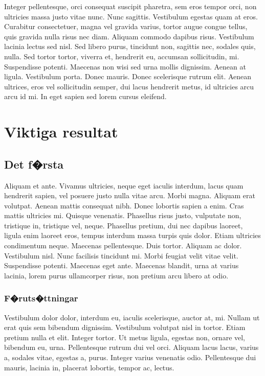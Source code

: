 \documentclass[a4paper,11pt]{kth-mag}
\begin{document}
Integer pellentesque, orci consequat suscipit pharetra, sem eros
tempor orci, non ultricies massa justo vitae nunc. Nunc sagittis.
Vestibulum egestas quam at eros. Curabitur consectetuer, magna vel
gravida varius, tortor augue congue tellus, quis gravida nulla risus
nec diam. Aliquam commodo dapibus risus. Vestibulum lacinia lectus sed
nisl. Sed libero purus, tincidunt non, sagittis nec, sodales quis,
nulla. Sed tortor tortor, viverra et, hendrerit eu, accumsan
sollicitudin, mi. Suspendisse potenti. Maecenas non wisi sed urna
mollis dignissim. Aenean at ligula. Vestibulum porta. Donec mauris.
Donec scelerisque rutrum elit. Aenean ultrices, eros vel sollicitudin
semper, dui lacus hendrerit metus, id ultricies arcu arcu id mi. In
eget sapien sed lorem cursus eleifend.

\part{Viktiga resultat}

\chapter{Det f�rsta}

Aliquam et ante. Vivamus ultricies, neque eget iaculis interdum, lacus
quam hendrerit sapien, vel posuere justo nulla vitae arcu. Morbi
magna. Aliquam erat volutpat. Aenean mattis consequat nibh. Donec
lobortis sapien a enim. Cras mattis ultricies mi. Quisque venenatis.
Phasellus risus justo, vulputate non, tristique in, tristique vel,
neque. Phasellus pretium, dui nec dapibus laoreet, ligula enim laoreet
eros, tempus interdum massa turpis quis dolor. Etiam ultricies
condimentum neque. Maecenas pellentesque. Duis tortor. Aliquam ac
dolor. Vestibulum nisl. Nunc facilisis tincidunt mi. Morbi feugiat
velit vitae velit. Suspendisse potenti. Maecenas eget ante. Maecenas
blandit, urna at varius lacinia, lorem purus ullamcorper risus, non
pretium arcu libero at odio.

\section{F�ruts�ttningar}

Vestibulum dolor dolor, interdum eu, iaculis scelerisque, auctor at,
mi. Nullam ut erat quis sem bibendum dignissim. Vestibulum volutpat
nisl in tortor. Etiam pretium nulla et elit. Integer tortor. Ut metus
ligula, egestas non, ornare vel, bibendum eu, urna. Pellentesque
rutrum dui vel orci. Aliquam lacus lacus, varius a, sodales vitae,
egestas a, purus. Integer varius venenatis odio. Pellentesque dui
mauris, lacinia in, placerat lobortis, tempor ac, lectus.
\end{document}
